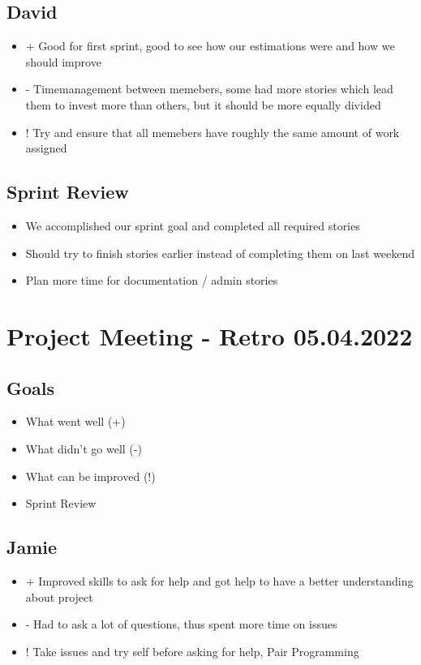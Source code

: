 \subsection{David}
\begin{itemize}
    \item + Good for first sprint, good to see how our estimations were and how we should improve
    \item - Timemanagement between memebers, some had more stories which lead them to invest more than others, but it should be more equally divided
    \item ! Try and ensure that all memebers have roughly the same amount of work assigned
\end{itemize}

\subsection{Sprint Review}
\begin{itemize}
    \item We accomplished our sprint goal and completed all required stories
    \item Should try to finish stories earlier instead of completing them on last weekend
    \item Plan more time for documentation / admin stories
\end{itemize}

\section{Project Meeting - Retro 05.04.2022}

\subsection{Goals}
\begin{itemize}
    \item What went well (+)
    \item What didn't go well (-)
    \item What can be improved (!)
    \item Sprint Review
\end{itemize}

\subsection{Jamie}
\begin{itemize}
    \item + Improved skills to ask for help and got help to have a better understanding about project
    \item - Had to ask a lot of questions, thus spent more time on issues
    \item ! Take issues and try self before asking for help, Pair Programming
\end{itemize}

